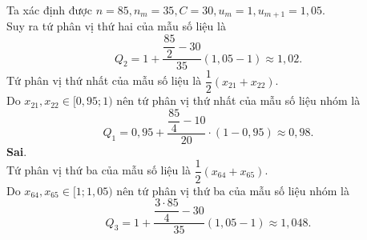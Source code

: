 \begin{ex}
{\begin{itemchoice}
   Ta xác định được $n =  85, n_m = 35, C = 30, u_m = 1, u_{m+1} = 1{,}05$.\\
   Suy ra tứ phân vị thứ hai của mẫu số liệu là $$Q_2 = 1 + \dfrac{\dfrac{85}{2} - 30}{35} (1{,}05 -  1) \approx 1{,}02.$$
   Tứ phân vị thứ nhất của mẫu số liệu là $\dfrac{1}{2} (x_{21} + x_{22})$.\\ 
   Do $x_{21}, x_{22} \in [0{,}95;1)$ nên tứ phân vị thứ nhất của mẫu số liệu nhóm là $$Q_1 = 0{,}95 + \dfrac{\dfrac{85}{4} - 10}{20} \cdot (1  - 0{,}95) \approx 0{,}98.$$
    \itemch \textbf{Sai}.\\
   Tứ phân  vị thứ ba của mẫu số liệu là $\dfrac{1}{2} (x_{64} + x_{65})$.\\
   Do $x_{64}, x_{65} \in  [1;1{,}05)$ nên tứ phân vị thứ ba của mẫu số liệu nhóm là
   $$Q_3 = 1 + \dfrac{\dfrac{3 \cdot 85}{4} - 30}{35} (1{,}05  - 1) \approx 1{,}048.$$
  \end{itemchoice}
  }
\end{ex}

